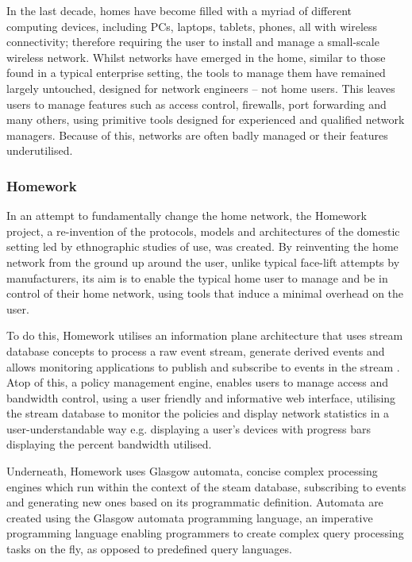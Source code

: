 In the last decade, homes have become filled with a myriad of different computing devices, including PCs, laptops, tablets, phones, all with wireless connectivity; therefore requiring the user to install and manage a small-scale wireless network. Whilst networks have emerged in the home, similar to those found in a typical enterprise setting, the tools to manage them have remained largely untouched, designed for network engineers -- not home users. This leaves users to manage features such as access control, firewalls, port forwarding and many others, using primitive tools designed for experienced and qualified network managers. Because of this, networks are often badly managed or their features underutilised.
\subsubsection{Homework} %
\label{ssub:homework}
In an attempt to fundamentally change the home network, the Homework project\cite{Homework, HomeworkControl}, a re-invention of the protocols, models and architectures of the domestic setting led by ethnographic studies of use, was created. By reinventing the home network from the ground up around the user, unlike typical face-lift attempts by manufacturers, its aim is to enable the typical home user to manage and be in control of their home network, using tools that induce a minimal overhead on the user. 

To do this, Homework utilises an information plane architecture that uses stream database concepts to process a raw event stream, generate derived events and allows monitoring applications to publish and subscribe to events in the stream \cite{InformationPlane}. Atop of this, a policy management engine, enables users to manage access and bandwidth control, using a user friendly and informative web interface, utilising the stream database to monitor the policies and display network statistics in a user-understandable way e.g. displaying a user's devices with progress bars displaying the percent bandwidth utilised.

Underneath, Homework uses Glasgow automata\cite{DEBSChallenge}, concise complex processing engines which run within the context of the steam database, subscribing to events and generating new ones based on its programmatic definition. Automata are created using the Glasgow automata programming language, an imperative programming language enabling programmers to create complex query processing tasks on the fly, as opposed to predefined query languages.


